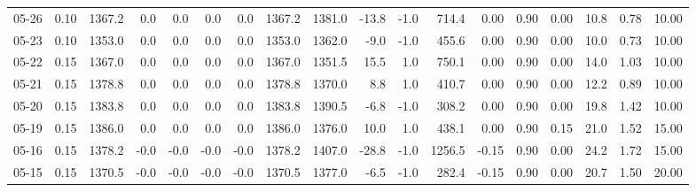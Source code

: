 \begin{threeparttable}
{\begin{tabular}{lrrrrrrrrrrrrrrrrr}
  05-26 &     0.10 & 1367.2 &               0.0 &               0.0 &                0.0 &                0.0 & 1367.2 & 1381.0 &      -13.8 &                     -1.0 &               714.4 &       0.00 &      0.90 &           0.00 &             10.8 &            0.78 &                  10.00 \\
  05-23 &     0.10 & 1353.0 &               0.0 &               0.0 &                0.0 &                0.0 & 1353.0 & 1362.0 &       -9.0 &                     -1.0 &               455.6 &       0.00 &      0.90 &           0.00 &             10.0 &            0.73 &                  10.00 \\
  05-22 &     0.15 & 1367.0 &               0.0 &               0.0 &                0.0 &                0.0 & 1367.0 & 1351.5 &       15.5 &                      1.0 &               750.1 &       0.00 &      0.90 &           0.00 &             14.0 &            1.03 &                  10.00 \\
  05-21 &     0.15 & 1378.8 &               0.0 &               0.0 &                0.0 &                0.0 & 1378.8 & 1370.0 &        8.8 &                      1.0 &               410.7 &       0.00 &      0.90 &           0.00 &             12.2 &            0.89 &                  10.00 \\
  05-20 &     0.15 & 1383.8 &               0.0 &               0.0 &                0.0 &                0.0 & 1383.8 & 1390.5 &       -6.8 &                     -1.0 &               308.2 &       0.00 &      0.90 &           0.00 &             19.8 &            1.42 &                  10.00 \\
  05-19 &     0.15 & 1386.0 &               0.0 &               0.0 &                0.0 &                0.0 & 1386.0 & 1376.0 &       10.0 &                      1.0 &               438.1 &       0.00 &      0.90 &           0.15 &             21.0 &            1.52 &                  15.00 \\
  05-16 &     0.15 & 1378.2 &              -0.0 &              -0.0 &               -0.0 &               -0.0 & 1378.2 & 1407.0 &      -28.8 &                     -1.0 &              1256.5 &      -0.15 &      0.90 &           0.00 &             24.2 &            1.72 &                  15.00 \\
  05-15 &     0.15 & 1370.5 &              -0.0 &              -0.0 &               -0.0 &               -0.0 & 1370.5 & 1377.0 &       -6.5 &                     -1.0 &               282.4 &      -0.15 &      0.90 &           0.00 &             20.7 &            1.50 &                  20.00 \\

\end{tabular}}
\end{threeparttable}

